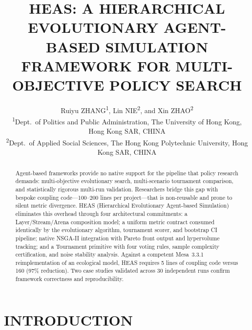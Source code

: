 \documentclass{wscpaperproc}
\begin{document}

\title{HEAS: A HIERARCHICAL EVOLUTIONARY AGENT-BASED SIMULATION FRAMEWORK
       FOR MULTI-OBJECTIVE POLICY SEARCH}

\author{\begin{center}Ruiyu ZHANG\textsuperscript{1}, Lin NIE\textsuperscript{2}, and Xin ZHAO\textsuperscript{2}\\
[11pt]
\textsuperscript{1}Dept.~of Politics and Public Administration, The University of Hong Kong, Hong Kong SAR, CHINA\\
\textsuperscript{2}Dept.~of Applied Social Sciences, The Hong Kong Polytechnic University, Hong Kong SAR, CHINA\end{center}
}

\maketitle

\vspace{-12pt}

\begin{abstract}
Agent-based frameworks provide no native support for the pipeline that policy
research demands: multi-objective evolutionary search, multi-scenario tournament
comparison, and statistically rigorous multi-run validation. Researchers bridge
this gap with bespoke coupling code---100--200 lines per project---that is
non-reusable and prone to silent metric divergence. HEAS (Hierarchical
Evolutionary Agent-based Simulation) eliminates this overhead through four
architectural commitments: a Layer/Stream/Arena composition model; a uniform
metric contract consumed identically by the evolutionary algorithm, tournament
scorer, and bootstrap CI pipeline; native NSGA-II integration with Pareto front
output and hypervolume tracking; and a Tournament primitive with four voting
rules, sample complexity certification, and noise stability analysis. Against a
competent Mesa~3.3.1 reimplementation of an ecological model, HEAS requires 5
lines of coupling code versus 160 (97\% reduction). Two case studies validated
across 30 independent runs confirm framework correctness and reproducibility.
\end{abstract}

\section{INTRODUCTION}
\end{document}
